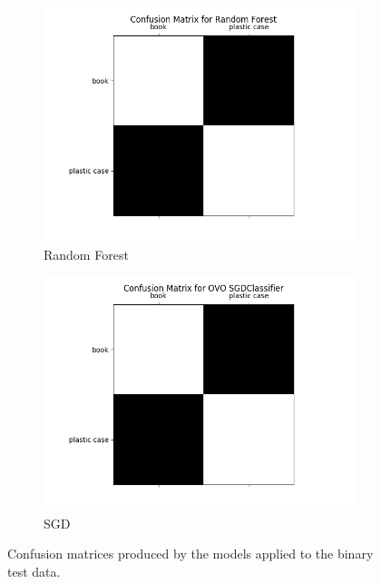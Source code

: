 \documentclass[12pt]{article}
\begin{document}
\begin{figure}[!ht]
\centering
\begin{subfigure}{.5\textwidth}
  \centering
  \includegraphics[width=\linewidth]{images/btestrf}
	\caption{Random Forest}
  \label{fig:brf}
\end{subfigure}%
\begin{subfigure}{.5\textwidth}
  \centering
  \includegraphics[width=\linewidth]{images/btestsgd}
  \caption{SGD}
  \label{fig:bsgd}
\end{subfigure}
\caption{Confusion matrices produced by the models applied to the binary test data.}
\label{fig:testbinary}
\end{figure}
\end{document}
